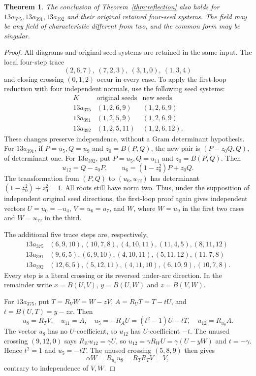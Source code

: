 \documentclass[11pt]{article}
\newtheorem{theorem}{Theorem}
\begin{document}
\begin{theorem}\label{thm:siblings}
The conclusion of Theorem~\ref{thm:reflection} also holds for
$13a_{375},13a_{391},13a_{392}$ and their original retained four-seed
systems. The field may be any field of characteristic different
from two, and the common form may be singular.
\end{theorem}
\begin{proof}
All diagrams and original seed systems are retained in the same input.
The local four-step trace
\[
                 (2,6,7),\ (7,2,3),\ (3,1,0),\ (1,3,4)
\]
and closing crossing $(0,1,2)$ occur in every case. To apply the
first-loop reduction with four independent normals, use the following
seed systems:
\[
\begin{array}{c|c|c}
 K&\text{original seeds}&\text{new seeds}\\\hline
13a_{375}&(1,2,6,9)&(1,2,6,9)\\
13a_{391}&(1,2,5,9)&(1,2,6,9)\\
13a_{392}&(1,2,5,11)&(1,2,6,12).
\end{array}
\]
These changes preserve independence, without a Gram determinant
hypothesis. For $13a_{391}$, if $P=u_5,Q=u_9$ and
$z_0=B(P,Q)$, the new pair is $(P-z_0Q,Q)$, of determinant one.
For $13a_{392}$, put $P=u_5,Q=u_{11}$ and $z_0=B(P,Q)$.
Then
\[
 u_{12}=Q-z_0P,\qquad
 u_6=(1-z_0^2)P+z_0Q.
\]
The transformation from $(P,Q)$ to $(u_6,u_{12})$ has determinant
$(1-z_0^2)+z_0^2=1$. All roots still have norm two.
Thus, under the supposition of independent original seed directions,
the first-loop proof again gives independent vectors
$U=u_0=-u_4$, $V=u_6=u_7$, and $W$, where $W=u_9$ in the first
two cases and $W=u_{12}$ in the third.

The additional five trace steps are, respectively,
\[
\begin{array}{c|l}
13a_{375}&(6,9,10),(10,7,8),(4,10,11),(11,4,5),(8,11,12)\\
13a_{391}&(9,6,5),(6,9,10),(4,10,11),(5,11,12),(11,7,8)\\
13a_{392}&(12,6,5),(5,12,11),(4,11,10),(6,10,9),(10,7,8).
\end{array}
\]
Every step is a literal crossing or its reversed under-arc direction.
In the remainder write $x=B(U,V)$, $y=B(U,W)$ and $z=B(V,W)$.

For $13a_{375}$, put $T=R_VW=W-zV$,
$A=R_UT=T-tU$, and $t=B(U,T)=y-zx$.
Then
\[
 u_8=R_TV,\quad u_{11}=A,\quad
 u_5=-R_AU=(t^2-1)U-tT,\quad u_{12}=R_{u_8}A.
\]
The vector $u_8$ has no $U$-coefficient, so $u_{12}$ has
$U$-coefficient $-t$. The unused crossing $(9,12,0)$ says
$R_Wu_{12}=\gamma U$, so
$u_{12}=\gamma R_WU=\gamma(U-yW)$ and $t=-\gamma$.
Hence $t^2=1$ and $u_5=-tT$. The unused crossing $(5,8,9)$
then gives
\[
                \alpha W=R_{u_5}u_8=R_TR_TV=V,
\]
contrary to independence of $V,W$.


\end{proof}
\end{document}
